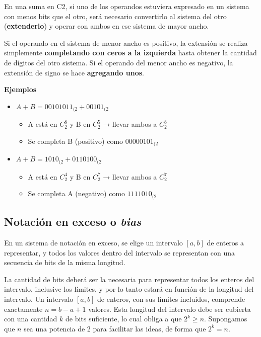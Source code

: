 \documentclass[spanish,a4paper,]{article}
\providecommand{\tightlist}{%
  \setlength{\itemsep}{0pt}\setlength{\parskip}{0pt}}
\begin{document}
En una suma en C2, si uno de los operandos estuviera expresado en un
sistema con menos bits que el otro, será necesario convertirlo al
sistema del otro (\textbf{extenderlo}) y operar con ambos en ese sistema
de mayor ancho.

Si el operando en el sistema de menor ancho es positivo, la extensión se
realiza simplemente \textbf{completando con ceros a la izquierda} hasta
obtener la cantidad de dígitos del otro sistema. Si el operando del
menor ancho es negativo, la extensión de signo se hace \textbf{agregando
unos}.

\textbf{Ejemplos}

\begin{itemize}
\tightlist
\item
  \(A + B = 00101011_{(2} + 00101_{(2}\)

  \begin{itemize}
  \tightlist
  \item
    A está en \(C^8_2\) y B en \(C^5_2\) → llevar ambos a \(C^8_2\)
  \item
    Se completa B (positivo) como \(00000101_{(2}\)
  \end{itemize}
\item
  \(A + B = 1010_{(2} + 0110100_{(2}\)

  \begin{itemize}
  \tightlist
  \item
    A está en \(C^4_2\) y B en \(C^7_2\) → llevar ambos a \(C^7_2\)
  \item
    Se completa A (negativo) como \(1111010_{(2}\)
  \end{itemize}
\end{itemize}

\hypertarget{notaciuxf3n-en-exceso-o-bias}{%
\subsection{\texorpdfstring{Notación en exceso o
\emph{bias}}{Notación en exceso o bias}}\label{notaciuxf3n-en-exceso-o-bias}}

En un sistema de notación en exceso, se elige un intervalo \([a, b]\) de
enteros a representar, y todos los valores dentro del intervalo se
representan con una secuencia de bits de la misma longitud.

La cantidad de bits deberá ser la necesaria para representar todos los
enteros del intervalo, inclusive los límites, y por lo tanto estará en
función de la longitud del intervalo. Un intervalo \([a, b]\) de
enteros, con sus límites incluidos, comprende exactamente
\(n = b - a + 1\) valores. Esta longitud del intervalo debe ser cubierta
con una cantidad \(k\) de bits suficiente, lo cual obliga a que
\(2^k \geq n\). Supongamos que \(n\) sea una potencia de 2 para
facilitar las ideas, de forma que \(2^k = n\).
\end{document}
